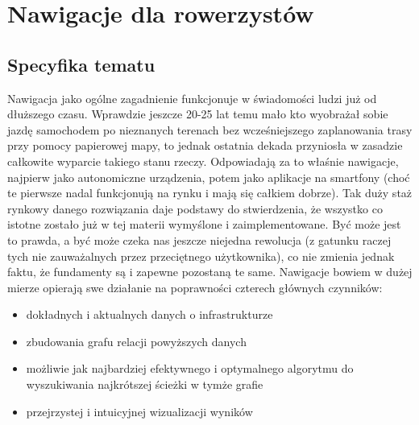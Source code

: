 \chapter{Nawigacje dla rowerzystów}
\label{cha:nawigacje_dla_rowerzystow}

\section{Specyfika tematu}

Nawigacja jako ogólne zagadnienie funkcjonuje w świadomości ludzi już od dłuższego czasu. Wprawdzie jeszcze 20-25 lat temu mało kto wyobrażał sobie jazdę samochodem po nieznanych terenach bez wcześniejszego zaplanowania trasy przy pomocy papierowej mapy, to jednak ostatnia dekada przyniosła w zasadzie całkowite wyparcie takiego stanu rzeczy. Odpowiadają za to właśnie nawigacje, najpierw jako autonomiczne urządzenia, potem jako aplikacje na smartfony (choć te pierwsze nadal funkcjonują na rynku i mają się całkiem dobrze). Tak duży staż rynkowy danego rozwiązania daje podstawy do stwierdzenia, że wszystko co istotne zostało już w tej materii wymyślone i zaimplementowane. Być może jest to prawda, a być może czeka nas jeszcze niejedna rewolucja (z gatunku raczej tych nie zauważalnych przez przeciętnego użytkownika), co nie zmienia jednak faktu, że fundamenty są i zapewne pozostaną te same. Nawigacje bowiem w dużej mierze opierają swe działanie na poprawności czterech głównych czynników:
\begin{itemize}
\item dokładnych i aktualnych danych o infrastrukturze 
\item zbudowania grafu relacji powyższych danych
\item możliwie jak najbardziej efektywnego i optymalnego algorytmu do wyszukiwania najkrótszej ścieżki w tymże grafie
\item przejrzystej i intuicyjnej wizualizacji wyników
\end{itemize}
